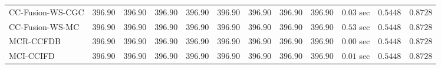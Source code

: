 \begin{table}[H]
\begin{tabular}{lrrrrrrrrrrr}
    CC-Fusion-WS-CGC & $       396.90$ & $       396.90$ & $       396.90$ & $       396.90$ & $       396.90$ & $       396.90$ & $       396.90$ & $       396.90$ & $         0.03$ sec    & $       0.5448$  & $       0.8728$ \\ 
     CC-Fusion-WS-MC & $       396.90$ & $       396.90$ & $       396.90$ & $       396.90$ & $       396.90$ & $       396.90$ & $       396.90$ & $       396.90$ & $         0.53$ sec    & $       0.5448$  & $       0.8728$ \\ 
\cmidrule{1-1} 
           MCR-CCFDB & $       396.90$ & $       396.90$ & $       396.90$ & $       396.90$ & $       396.90$ & $       396.90$ & $       396.90$ & $       396.90$ & $         0.00$ sec    & $       0.5448$  & $       0.8728$ \\ 
\cmidrule{1-1} 
           MCI-CCIFD & $       396.90$ & $       396.90$ & $       396.90$ & $       396.90$ & $       396.90$ & $       396.90$ & $       396.90$ & $       396.90$ & $         0.01$ sec    & $       0.5448$  & $       0.8728$ \\ 
\bottomrule
\end{tabular}
\end{table}

